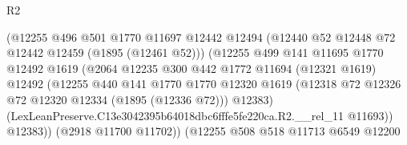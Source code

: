 \begin{lexlean}{R2}
\begin{coremodule}
                                        (@12255
                                          @496
                                          @501
                                          @1770
                                          @11697
                                          @12442
                                          @12494
                                          (@12440 @52 @12448 @72 @12442 @12459 (@1895 (@12461 @52)))
                                          (@12255
                                            @499
                                            @141
                                            @11695
                                            @1770
                                            @12492
                                            @1619
                                            (@2064
                                              @12235
                                              @300
                                              @442
                                              @1772
                                              @11694
                                              (@12321 @1619)
                                              @12492
                                              (@12255
                                                @440
                                                @141
                                                @1770
                                                @1770
                                                @12320
                                                @1619
                                                (@12318
                                                  @72
                                                  @12326
                                                  @72
                                                  @12320
                                                  @12334
                                                  (@1895 (@12336 @72)))
                                                @12383)
                                              (LexLeanPreserve.C13e3042395b64018dbc6fffe5fe220ca.R2.__rel_11
                                                @11693))
                                            @12383))
                                        (@2918 @11700 @11702))
                                      (@12255
                                        @508
                                        @518
                                        @11713
                                        @6549
                                        @12200

\end{coremodule}
\end{lexlean}
